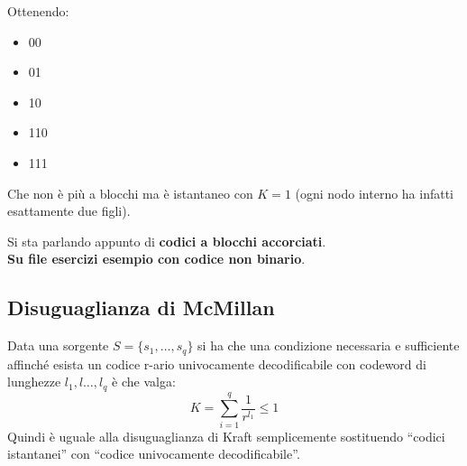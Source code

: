 \documentclass[a4paper,12pt, oneside]{book}
\begin{document}
\begin{esempio}
\begin{figure}[H]
  \end{figure}
  Ottenendo:
  \begin{itemize}
    \item 00
    \item 01
    \item 10
    \item 110
    \item 111
  \end{itemize}
  Che non è più a blocchi ma è istantaneo con $K=1$ (ogni nodo interno ha
  infatti esattamente due figli).
\end{esempio}
Si sta parlando appunto di \textbf{codici a blocchi accorciati}.\\
\textbf{Su file esercizi esempio con codice non binario}.
\subsection{Disuguaglianza di McMillan}
\begin{teorema}
  Data una sorgente $S=\{s_1,\ldots,s_q\}$ si ha che una condizione necessaria e
  sufficiente affinché esista un codice r-ario univocamente decodificabile con
  codeword di lunghezze $l_1,l\dots,l_q$ è che valga:
  \[K=\sum_{i=1}^q\frac{1}{r^{l_1}}\leq 1\]
  \textup{Quindi è uguale alla disuguaglianza di Kraft semplicemente sostituendo
  ``codici istantanei'' con ``codice univocamente decodificabile''.}
\end{teorema}
\end{document}
